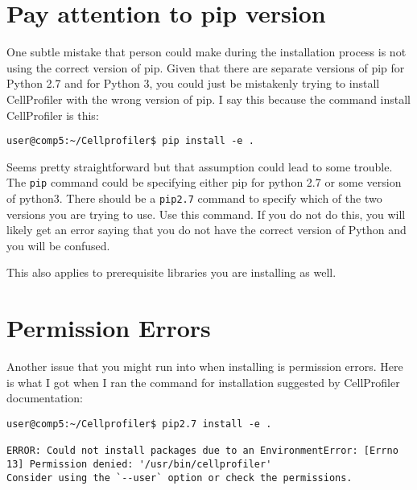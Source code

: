 \documentclass[
  letterpaper,
  DIV=11,
  numbers=noendperiod]{scrreprt}
\begin{document}
\hypertarget{pay-attention-to-pip-version}{%
\section*{\texorpdfstring{\textbf{Pay attention to pip
version}}{Pay attention to pip version}}\label{pay-attention-to-pip-version}}

One subtle mistake that person could make during the installation
process is not using the correct version of pip. Given that there are
separate versions of pip for Python 2.7 and for Python 3, you could just
be mistakenly trying to install CellProfiler with the wrong version of
pip. I say this because the command install CellProfiler is this:

\begin{verbatim}
user@comp5:~/Cellprofiler$ pip install -e .
\end{verbatim}

Seems pretty straightforward but that assumption could lead to some
trouble. The \texttt{pip} command could be specifying either pip for
python 2.7 or some version of python3. There should be a \texttt{pip2.7}
command to specify which of the two versions you are trying to use. Use
this command. If you do not do this, you will likely get an error saying
that you do not have the correct version of Python and you will be
confused.

This also applies to prerequisite libraries you are installing as well.

\hypertarget{permission-errors}{%
\section*{\texorpdfstring{\textbf{Permission
Errors}}{Permission Errors}}\label{permission-errors}}

Another issue that you might run into when installing is permission
errors. Here is what I got when I ran the command for installation
suggested by CellProfiler documentation:

\begin{verbatim}
user@comp5:~/Cellprofiler$ pip2.7 install -e .

ERROR: Could not install packages due to an EnvironmentError: [Errno 13] Permission denied: '/usr/bin/cellprofiler'
Consider using the `--user` option or check the permissions.
\end{verbatim}
\end{document}
